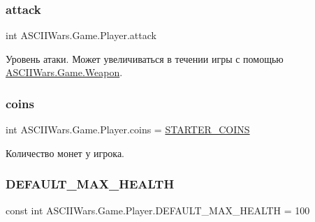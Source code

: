 \subsubsection{\texorpdfstring{attack}{attack}}
{\footnotesize\ttfamily int A\+S\+C\+I\+I\+Wars.\+Game.\+Player.\+attack}



Уровень атаки. Может увеличиваться в течении игры с помощью \hyperlink{class_a_s_c_i_i_wars_1_1_game_1_1_weapon}{A\+S\+C\+I\+I\+Wars.\+Game.\+Weapon}. 

\hypertarget{class_a_s_c_i_i_wars_1_1_game_1_1_player_a5abede19c5428143df924357ad475691}{}\label{class_a_s_c_i_i_wars_1_1_game_1_1_player_a5abede19c5428143df924357ad475691} 
\subsubsection{\texorpdfstring{coins}{coins}}
{\footnotesize\ttfamily int A\+S\+C\+I\+I\+Wars.\+Game.\+Player.\+coins = \hyperlink{class_a_s_c_i_i_wars_1_1_game_1_1_player_af33b6af0d723918290a4a38aa4a6fb66}{S\+T\+A\+R\+T\+E\+R\+\_\+\+C\+O\+I\+NS}}



Количество монет у игрока. 

\hypertarget{class_a_s_c_i_i_wars_1_1_game_1_1_player_ab5921985db319187e317563c15ef48dc}{}\label{class_a_s_c_i_i_wars_1_1_game_1_1_player_ab5921985db319187e317563c15ef48dc} 
\subsubsection{\texorpdfstring{D\+E\+F\+A\+U\+L\+T\+\_\+\+M\+A\+X\+\_\+\+H\+E\+A\+L\+TH}{DEFAULT\_MAX\_HEALTH}}
{\footnotesize\ttfamily const int A\+S\+C\+I\+I\+Wars.\+Game.\+Player.\+D\+E\+F\+A\+U\+L\+T\+\_\+\+M\+A\+X\+\_\+\+H\+E\+A\+L\+TH = 100\hspace{0.3cm}{\ttfamily [private]}}



